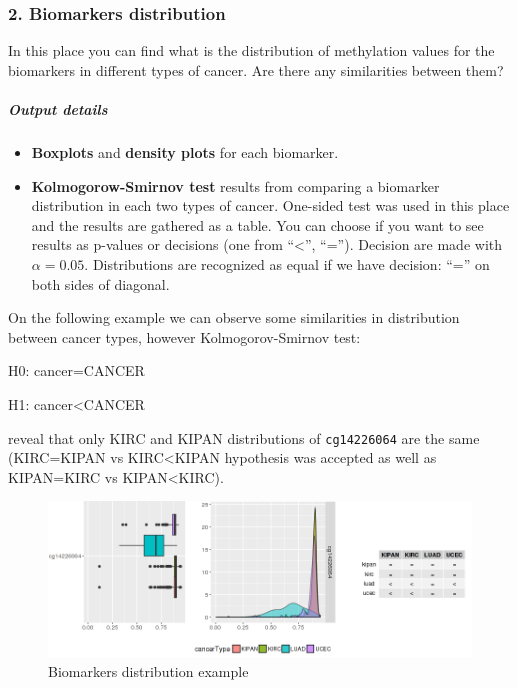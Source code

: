 \subsubsection{2. Biomarkers
distribution}\label{biomarkers-distribution}

In this place you can find what is the distribution of methylation
values for the biomarkers in different types of cancer. Are there any
similarities between them?

\subparagraph{Output details}\label{output-details-1}

\begin{itemize}
\itemsep1pt\parskip0pt
\item
  \textbf{Boxplots} and \textbf{density plots} for each biomarker.
\item
  \textbf{Kolmogorow-Smirnov test} results from comparing a biomarker
  distribution in each two types of cancer. One-sided test was used in
  this place and the results are gathered as a table. You can choose if
  you want to see results as p-values or decisions (one from
  ``\textless{}'', ``=''). Decision are made with \(\alpha=0.05\).
  Distributions are recognized as equal if we have decision: ``='' on
  both sides of diagonal.
\end{itemize}

On the following example we can observe some similarities in
distribution between cancer types, however Kolmogorov-Smirnov test:

H0: cancer=CANCER

H1: cancer\textless{}CANCER

reveal that only KIRC and KIPAN distributions of \texttt{cg14226064} are
the same (KIRC=KIPAN vs KIRC\textless{}KIPAN hypothesis was accepted as
well as KIPAN=KIRC vs KIPAN\textless{}KIRC).

\begin{figure}[htbp]
  \centering
  \includegraphics[scale=0.45]{kstest}
  \caption{Biomarkers distribution example}
  \label{figure:rlogo}
\end{figure}

